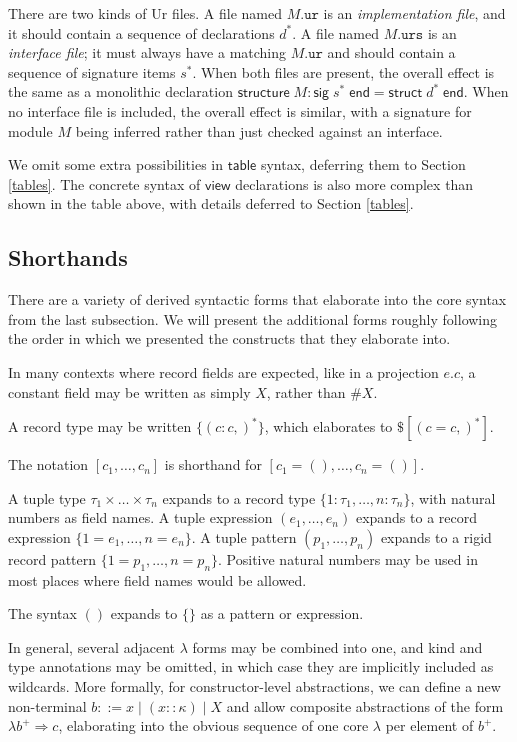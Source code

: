 \documentclass{article}
\newcommand{\mt}[1]{\mathsf{#1}}
\begin{document}
There are two kinds of Ur files.  A file named $M\texttt{.ur}$ is an \emph{implementation file}, and it should contain a sequence of declarations $d^*$.  A file named $M\texttt{.urs}$ is an \emph{interface file}; it must always have a matching $M\texttt{.ur}$ and should contain a sequence of signature items $s^*$.  When both files are present, the overall effect is the same as a monolithic declaration $\mt{structure} \; M : \mt{sig} \; s^* \; \mt{end} = \mt{struct} \; d^* \; \mt{end}$.  When no interface file is included, the overall effect is similar, with a signature for module $M$ being inferred rather than just checked against an interface.

We omit some extra possibilities in $\mt{table}$ syntax, deferring them to Section \ref{tables}.  The concrete syntax of $\mt{view}$ declarations is also more complex than shown in the table above, with details deferred to Section \ref{tables}.

\subsection{Shorthands}

There are a variety of derived syntactic forms that elaborate into the core syntax from the last subsection.  We will present the additional forms roughly following the order in which we presented the constructs that they elaborate into.

In many contexts where record fields are expected, like in a projection $e.c$, a constant field may be written as simply $X$, rather than $\#X$.

A record type may be written $\{(c : c,)^*\}$, which elaborates to $\$[(c = c,)^*]$.

The notation $[c_1, \ldots, c_n]$ is shorthand for $[c_1 = (), \ldots, c_n = ()]$.

A tuple type $\tau_1 \times \ldots \times \tau_n$ expands to a record type $\{1 : \tau_1, \ldots, n : \tau_n\}$, with natural numbers as field names.  A tuple expression $(e_1, \ldots, e_n)$ expands to a record expression $\{1 = e_1, \ldots, n = e_n\}$.  A tuple pattern $(p_1, \ldots, p_n)$ expands to a rigid record pattern $\{1 = p_1, \ldots, n = p_n\}$.  Positive natural numbers may be used in most places where field names would be allowed.

The syntax $()$ expands to $\{\}$ as a pattern or expression.

In general, several adjacent $\lambda$ forms may be combined into one, and kind and type annotations may be omitted, in which case they are implicitly included as wildcards.  More formally, for constructor-level abstractions, we can define a new non-terminal $b ::= x \mid (x :: \kappa) \mid X$ and allow composite abstractions of the form $\lambda b^+ \Rightarrow c$, elaborating into the obvious sequence of one core $\lambda$ per element of $b^+$.
\end{document}

